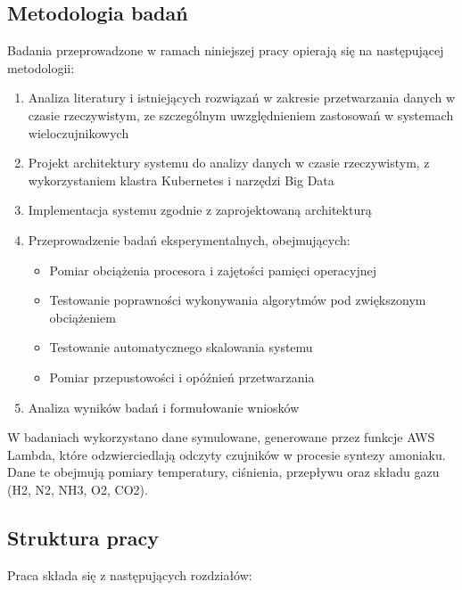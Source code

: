 \subsection{Metodologia badań}
\label{subsec:metodologia}

Badania przeprowadzone w ramach niniejszej pracy opierają się na następującej metodologii:

\begin{enumerate}
    \item Analiza literatury i istniejących rozwiązań w zakresie przetwarzania danych w czasie rzeczywistym, ze szczególnym uwzględnieniem zastosowań w systemach wieloczujnikowych
    \item Projekt architektury systemu do analizy danych w czasie rzeczywistym, z wykorzystaniem klastra Kubernetes i narzędzi Big Data
    \item Implementacja systemu zgodnie z zaprojektowaną architekturą
    \item Przeprowadzenie badań eksperymentalnych, obejmujących:
    \begin{itemize}
        \item Pomiar obciążenia procesora i zajętości pamięci operacyjnej
        \item Testowanie poprawności wykonywania algorytmów pod zwiększonym obciążeniem
        \item Testowanie automatycznego skalowania systemu
        \item Pomiar przepustowości i opóźnień przetwarzania
    \end{itemize}
    \item Analiza wyników badań i formułowanie wniosków
\end{enumerate}

W badaniach wykorzystano dane symulowane, generowane przez funkcje AWS Lambda, które odzwierciedlają odczyty czujników w procesie syntezy amoniaku. Dane te obejmują pomiary temperatury, ciśnienia, przepływu oraz składu gazu (H2, N2, NH3, O2, CO2).

\subsection{Struktura pracy}
\label{subsec:struktura}

Praca składa się z następujących rozdziałów:

